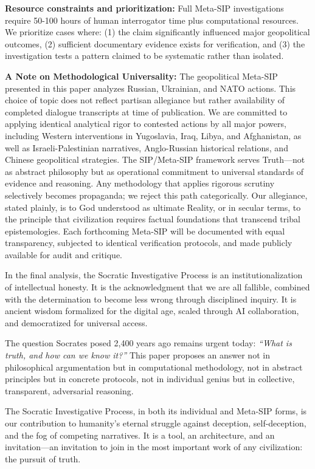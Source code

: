 \documentclass[11pt,a4paper]{article}
\begin{document}
\begin{small}
\textbf{Resource constraints and prioritization:} Full Meta-SIP 
investigations require 50-100 hours of human interrogator time plus 
computational resources. We prioritize cases where: (1) the claim 
significantly influenced major geopolitical outcomes, (2) sufficient 
documentary evidence exists for verification, and (3) the investigation 
tests a pattern claimed to be systematic rather than isolated.

\vspace{0.5em}
\noindent \textbf{A Note on Methodological Universality:} The geopolitical Meta-SIP presented in this paper analyzes Russian, Ukrainian, and NATO actions. This choice of topic does not reflect partisan allegiance but rather availability of completed dialogue transcripts at time of publication. We are committed to applying identical analytical rigor to contested actions by all major powers, including Western interventions in Yugoslavia, Iraq, Libya, and Afghanistan, as well as Israeli-Palestinian narratives, Anglo-Russian historical relations, and Chinese geopolitical strategies. The SIP/Meta-SIP framework serves Truth—not as abstract philosophy but as operational commitment to universal standards of evidence and reasoning. Any methodology that applies rigorous scrutiny selectively becomes propaganda; we reject this path categorically. Our allegiance, stated plainly, is to God understood as ultimate Reality, or in secular terms, to the principle that civilization requires factual foundations that transcend tribal epistemologies. Each forthcoming Meta-SIP will be documented with equal transparency, subjected to identical verification protocols, and made publicly available for audit and critique.

In the final analysis, the Socratic Investigative Process is an institutionalization of intellectual honesty. It is the acknowledgment that we are all fallible, combined with the determination to become less wrong through disciplined inquiry. It is ancient wisdom formalized for the digital age, scaled through AI collaboration, and democratized for universal access.

The question Socrates posed 2,400 years ago remains urgent today: \textit{``What is truth, and how can we know it?''} This paper proposes an answer not in philosophical argumentation but in computational methodology, not in abstract principles but in concrete protocols, not in individual genius but in collective, transparent, adversarial reasoning.

The Socratic Investigative Process, in both its individual and Meta-SIP forms, is our contribution to humanity's eternal struggle against deception, self-deception, and the fog of competing narratives. It is a tool, an architecture, and an invitation---an invitation to join in the most important work of any civilization: the pursuit of truth.


\end{small}
\end{document}
